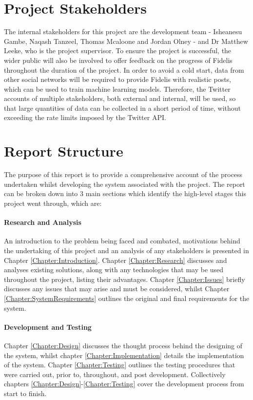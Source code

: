\section{Project Stakeholders}
The internal stakeholders for this project are the development team - Isheanesu Gambe, Naqash Tanzeel, Thomas Mcaloone and Jordan Olney - and Dr Matthew Leeke, who is the project supervisor. To ensure the project is successful, the wider public will also be involved to offer feedback on the progress of Fidelis throughout the duration of the project. In order to avoid a cold start, data from other social networks will be required to provide Fidelis with realistic posts, which can be used to train machine learning models. Therefore, the Twitter accounts of multiple stakeholders, both external and internal, will be used, so that large quantities of data can be collected in a short period of time, without exceeding the rate limits imposed by the Twitter API.

\section{Report Structure}
The purpose of this report is to provide a comprehensive account of the process undertaken whilst developing the system associated with the project. The report can be broken down into 3 main sections which identify the high-level stages this project went through, which are:

\paragraph{Research and Analysis}
An introduction to the problem being faced and combated, motivations behind the undertaking of this project and an analysis of any stakeholders is presented in Chapter \ref{Chapter:Introduction}. Chapter \ref{Chapter:Research} discusses and analyses existing solutions, along with any technologies that may be used throughout the project, listing their advantages. Chapter \ref{Chapter:Issues} briefly discusses any issues that may arise and must be considered, whilst Chapter \ref{Chapter:SystemRequirements} outlines the original and final requirements for the system.

\paragraph{Development and Testing}
Chapter \ref{Chapter:Design} discusses the thought process behind the designing of the system, whilst chapter \ref{Chapter:Implementation} details the implementation of the system. Chapter \ref{Chapter:Testing} outlines the testing procedures that were carried out, prior to, throughout, and post development. Collectively chapters \ref{Chapter:Design}-\ref{Chapter:Testing} cover the development process from start to finish.


